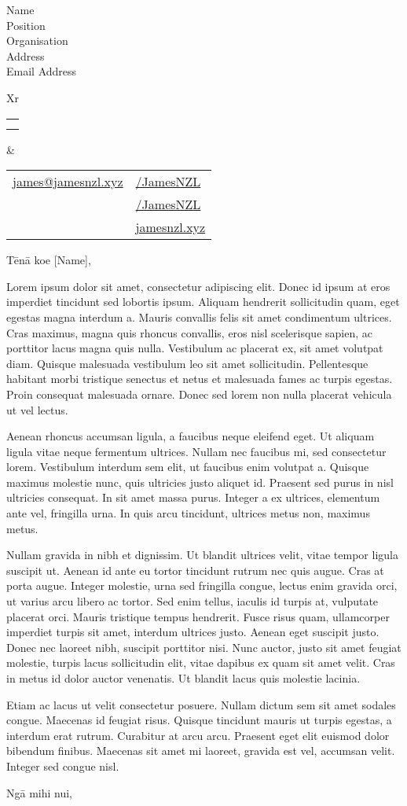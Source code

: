 \documentclass[11pt,a4paper]{letter}[leftmargin=*]
\date{\today}
\makeatletter
\def \fullname {James Bao}
\def \subtitle {}
\def \emailicon {\faAt}
\def \emaillink {mailto:james@jamesnzl.xyz}
\def \emailtext {james@jamesnzl.xyz}
\def \phoneicon {\faMobile}
\def \phonetext {+64 22 410 1580}
\def \addressicon {\faMapMarker*}
\def \addresstext {Auckland, New Zealand}
\def \linkedinicon {\faLinkedin}
\def \linkedinlink {https://www.linkedin.com/in/jamesnzl/}
\def \linkedintext {/JamesNZL}
\def \githubicon {\faGithub}
\def \githublink {https://github.com/jamesnzl}
\def \githubtext {/JamesNZL}
\def \websiteicon {\faGlobe}
\def \websitelink {https://jamesnzl.xyz/}
\def \websitetext {jamesnzl.xyz}
\def \headertype {\doublecol} %
\def \email {\emailicon \hspace{3pt}\href{\emaillink}{\emailtext}}
\def \phone {\phoneicon \hspace{3pt}{ \phonetext}}
\def \address {\addressicon \hspace{3pt}{\addresstext}}
\def \linkedin {\linkedinicon \hspace{3pt}\href{\linkedinlink}{\linkedintext}}
\def \github {\githubicon \hspace{3pt}\href{\githublink}{\githubtext}}
\def \website {\websiteicon \hspace{3pt}\href{\websitelink}{\websitetext}}
\newcommand{\doublecol}[6]{
  \begin{tabularx}{\textwidth}{Xr}
    {
      \begin{tabular}[c]{l}
        \fontsize{35}{45}\selectfont{\color{primary}{{\textbf{\fullname}}}} \\
        {\textit{\subtitle}} %
      \end{tabular}
    } & {
      \begin{tabular}[c]{l@{\hspace{1.5em}}l}
        {\small#4} & {\small#1} \\
        {\small#5} & {\small#2} \\
        {\small#6} & {\small#3}
      \end{tabular}
    }
  \end{tabularx}
}
\newcommand{\singlecol}[6]{
  \begin{tabularx}{\textwidth}{Xr}
    {
      \begin{tabular}[b]{l}
        \fontsize{35}{45}\selectfont{\color{primary}{{\textbf{\fullname}}}} \\
        {\textit{\subtitle}} %
      \end{tabular}
    } & {
      \begin{tabular}[c]{l}
        {\small#1} \\
        {\small#2} \\
        {\small#3} \\
        {\small#4} \\
        {\small#5} \\
        {\small#6}
      \end{tabular}
    }
  \end{tabularx}
}
\makeatother
\begin{document}
\begin{letter}{
    Name\\
    Position\\
    Organisation\\
    Address\\
    Email Address
  }


  \begin{flushleft}
    \headertype{\linkedin}{\github}{\website}{\email}{\phone}{\address} %
  \end{flushleft}

  \opening{Tēnā koe [Name],}

  Lorem ipsum dolor sit amet, consectetur adipiscing elit.
  Donec id ipsum at eros imperdiet tincidunt sed lobortis ipsum.
  Aliquam hendrerit sollicitudin quam, eget egestas magna interdum a.
  Mauris convallis felis sit amet condimentum ultrices.
  Cras maximus, magna quis rhoncus convallis, eros nisl scelerisque sapien, ac porttitor lacus magna quis nulla.
  Vestibulum ac placerat ex, sit amet volutpat diam.
  Quisque malesuada vestibulum leo sit amet sollicitudin.
  Pellentesque habitant morbi tristique senectus et netus et malesuada fames ac turpis egestas.
  Proin consequat malesuada ornare.
  Donec sed lorem non nulla placerat vehicula ut vel lectus.

  Aenean rhoncus accumsan ligula, a faucibus neque eleifend eget.
  Ut aliquam ligula vitae neque fermentum ultrices.
  Nullam nec faucibus mi, sed consectetur lorem.
  Vestibulum interdum sem elit, ut faucibus enim volutpat a.
  Quisque maximus molestie nunc, quis ultricies justo aliquet id.
  Praesent sed purus in nisl ultricies consequat.
  In sit amet massa purus.
  Integer a ex ultrices, elementum ante vel, fringilla urna.
  In quis arcu tincidunt, ultrices metus non, maximus metus.

  Nullam gravida in nibh et dignissim.
  Ut blandit ultrices velit, vitae tempor ligula suscipit ut.
  Aenean id ante eu tortor tincidunt rutrum nec quis augue.
  Cras at porta augue.
  Integer molestie, urna sed fringilla congue, lectus enim gravida orci, ut varius arcu libero ac tortor.
  Sed enim tellus, iaculis id turpis at, vulputate placerat orci.
  Mauris tristique tempus hendrerit.
  Fusce risus quam, ullamcorper imperdiet turpis sit amet, interdum ultrices justo.
  Aenean eget suscipit justo.
  Donec nec laoreet nibh, suscipit porttitor nisi.
  Nunc auctor, justo sit amet feugiat molestie, turpis lacus sollicitudin elit, vitae dapibus ex quam sit amet velit.
  Cras in metus id dolor auctor venenatis.
  Ut blandit lacus quis molestie lacinia.

  Etiam ac lacus ut velit consectetur posuere.
  Nullam dictum sem sit amet sodales congue.
  Maecenas id feugiat risus.
  Quisque tincidunt mauris ut turpis egestas, a interdum erat rutrum.
  Curabitur at arcu arcu.
  Praesent eget elit euismod dolor bibendum finibus.
  Maecenas sit amet mi laoreet, gravida est vel, accumsan velit.
  Integer sed congue nisl.

  \closing{Ngā mihi nui,}

\end{letter}
\end{document}
